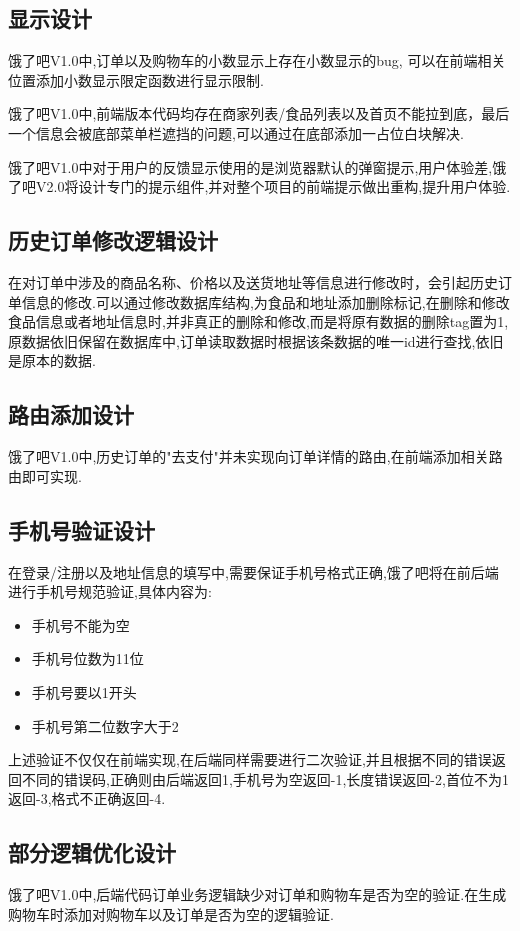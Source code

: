 \subsection{显示设计}
饿了吧V1.0中,订单以及购物车的小数显示上存在小数显示的bug, 可以在前端相关位置添加小数显示限定函数进行显示限制.

饿了吧V1.0中,前端版本代码均存在商家列表/食品列表以及首页不能拉到底，最后⼀个信息会被底部菜单栏遮挡的问题,可以通过在底部添加一占位白块解决.

饿了吧V1.0中对于用户的反馈显示使用的是浏览器默认的弹窗提示,用户体验差,饿了吧V2.0将设计专门的提示组件,并对整个项目的前端提示做出重构,提升用户体验.

\subsection{历史订单修改逻辑设计}在对订单中涉及的商品名称、价格以及送货地址等信息进行修改时，会引起历史订单信息的修改.可以通过修改数据库结构,为食品和地址添加删除标记,在删除和修改食品信息或者地址信息时,并非真正的删除和修改,而是将原有数据的删除tag置为1,原数据依旧保留在数据库中,订单读取数据时根据该条数据的唯一id进行查找,依旧是原本的数据.

\subsection{路由添加设计}
饿了吧V1.0中,历史订单的"去支付"并未实现向订单详情的路由,在前端添加相关路由即可实现.

\subsection{手机号验证设计}
在登录/注册以及地址信息的填写中,需要保证手机号格式正确,饿了吧将在前后端进行手机号规范验证,具体内容为:
\begin{itemize}
    \item 手机号不能为空
    \item 手机号位数为11位
    \item 手机号要以1开头
    \item 手机号第二位数字大于2
\end{itemize}
上述验证不仅仅在前端实现,在后端同样需要进行二次验证,并且根据不同的错误返回不同的错误码,正确则由后端返回1,手机号为空返回-1,长度错误返回-2,首位不为1返回-3,格式不正确返回-4.

\subsection{部分逻辑优化设计}
饿了吧V1.0中,后端代码订单业务逻辑缺少对订单和购物车是否为空的验证.在生成购物车时添加对购物车以及订单是否为空的逻辑验证.
